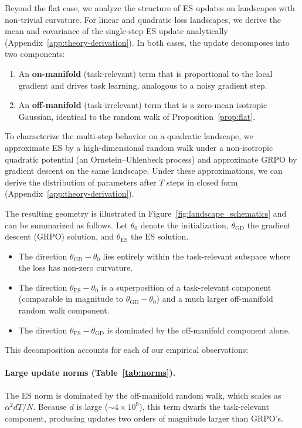 Beyond the flat case, we analyze the structure of ES updates on landscapes with non-trivial curvature. For linear and quadratic loss landscapes, we derive the mean and covariance of the single-step ES update analytically (Appendix~\ref{app:theory-derivation}). In both cases, the update decomposes into two components:
\begin{enumerate}
    \item An \textbf{on-manifold} (task-relevant) term that is proportional to the local gradient and drives task learning, analogous to a noisy gradient step.
    \item An \textbf{off-manifold} (task-irrelevant) term that is a zero-mean isotropic Gaussian, identical to the random walk of Proposition~\ref{prop:flat}.
\end{enumerate}

To characterize the multi-step behavior on a quadratic landscape, we approximate ES by a high-dimensional random walk under a non-isotropic quadratic potential (an Ornstein--Uhlenbeck process) and approximate GRPO by gradient descent on the same landscape. Under these approximations, we can derive the distribution of parameters after $T$ steps in closed form (Appendix~\ref{app:theory-derivation}).

The resulting geometry is illustrated in Figure~\ref{fig:landscape_schematics} and can be summarized as follows. Let $\theta_0$ denote the initialization, $\theta_{\mathrm{GD}}$ the gradient descent (GRPO) solution, and $\theta_{\mathrm{ES}}$ the ES solution.
\begin{itemize}
    \item The direction $\theta_{\mathrm{GD}} - \theta_0$ lies entirely within the task-relevant subspace where the loss has non-zero curvature.
    \item The direction $\theta_{\mathrm{ES}} - \theta_0$ is a superposition of a task-relevant component (comparable in magnitude to $\theta_{\mathrm{GD}} - \theta_0$) and a much larger off-manifold random walk component.
    \item The direction $\theta_{\mathrm{ES}} - \theta_{\mathrm{GD}}$ is dominated by the off-manifold component alone.
\end{itemize}

This decomposition accounts for each of our empirical observations:

\paragraph{Large update norms (Table~\ref{tab:norms}).} The ES norm is dominated by the off-manifold random walk, which scales as $\alpha^2 dT/N$. Because $d$ is large (${\sim}4 \times 10^9$), this term dwarfs the task-relevant component, producing updates two orders of magnitude larger than GRPO's.

